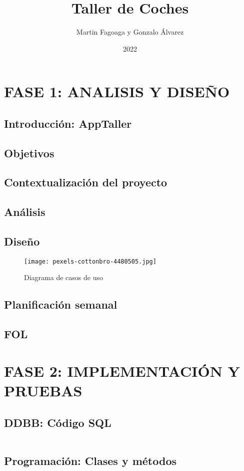 \documentclass{article}
\title{Taller de Coches}
\author{Martin Fagoaga y Gonzalo Álvarez}
\date{2022}
\begin{document}
\maketitle 
\clearpage
\tableofcontents
\clearpage
\listoffigures
\clearpage

\section{FASE 1: ANALISIS Y DISEÑO}
\subsection{Introducción: AppTaller}
\subsection{Objetivos}
\subsection{Contextualización del proyecto}
\subsection{Análisis}
\subsection{Diseño} 
\begin{figure}[H]
  \centering
  \texttt{[image: pexels-cottonbro-4480505.jpg]}
  \caption{Diagrama de casos de uso}
\end{figure}
\subsection{Planificación semanal}
\subsection{FOL}
\section{FASE 2: IMPLEMENTACIÓN Y PRUEBAS}
\subsection{DDBB: Código SQL}
\inputminted[]{sql}{./Script.sql}
\subsection{Programación: Clases y métodos}
\end{document}
